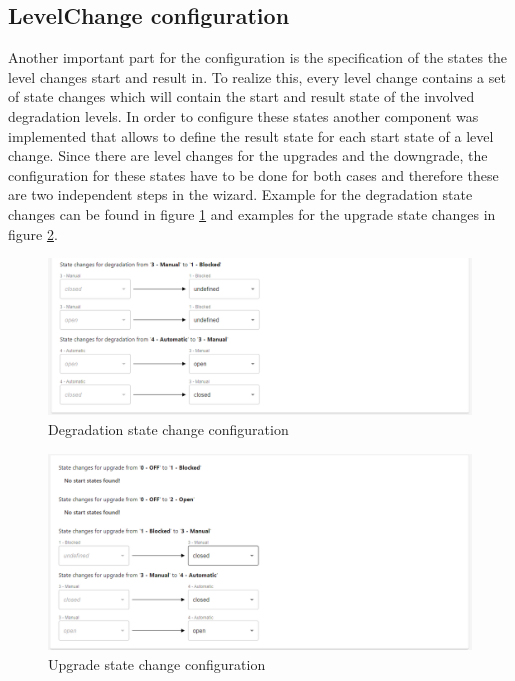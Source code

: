\subsection{LevelChange configuration}
Another important part for the configuration is the specification of the states the level changes start and result in. To realize this, every level change contains a set of state changes which will contain the start and result state of the involved degradation levels. In order to configure these states another component was implemented that allows to define the result state for each start state of a level change. Since there are level changes for the upgrades and the downgrade, the configuration for these states have to be done for both cases and therefore these are two independent steps in the wizard. Example for the degradation state changes can be found in figure \ref{fig:deg_state_change} and examples for the upgrade state changes in figure \ref{fig:upg:state_change}. 

\begin{figure}[ht]
    \centering
    \includegraphics[width=\textwidth]{img/degradation_level_change_states.png}
    \caption{Degradation state change configuration}
    \label{fig:deg_state_change}
\end{figure}

\begin{figure}[ht]
    \centering
    \includegraphics[width=\textwidth]{img/upgrade_level_change_states.png}
    \caption{Upgrade state change configuration}
    \label{fig:upg:state_change}
\end{figure}

